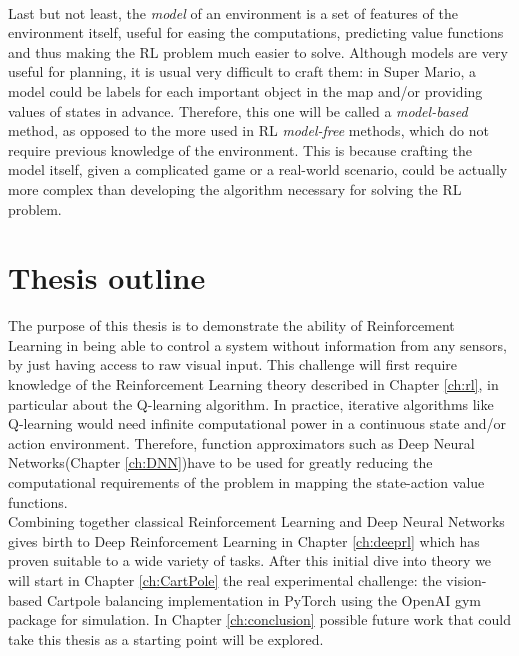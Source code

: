 \\
\indent Last but not least, the \textit{model} of an environment is a set of features of the environment itself, useful for easing the computations, predicting value functions and thus making the RL problem much easier to solve. Although models are very useful for planning, it is usual very difficult to craft them: in Super Mario, a model could be labels for each important object in the map and/or providing values of states in advance. Therefore, this one will be called a \textit{model-based} method, as opposed to the more used in RL \textit{model-free} methods, which do not require previous knowledge of the environment. This is because crafting the model itself, given a complicated game or a real-world scenario, could be actually more complex than developing the algorithm necessary for solving the RL problem.


\section{Thesis outline}

The purpose of this thesis is to demonstrate the ability of Reinforcement Learning in being able to control a system without information from any sensors, by just having access to raw visual input. This challenge will first require knowledge of the Reinforcement Learning theory described in Chapter \ref{ch:rl}, in particular about the Q-learning algorithm. In practice, iterative algorithms like Q-learning would need infinite computational power in a continuous state and/or action environment. Therefore, function approximators such as Deep Neural Networks(Chapter \ref{ch:DNN})have to be used for greatly reducing the computational requirements of the problem in mapping the state-action value functions. 
\\
\indent Combining together classical Reinforcement Learning and Deep Neural Networks gives birth to Deep Reinforcement Learning in Chapter \ref{ch:deeprl} which has proven suitable to a wide variety of tasks. After this initial dive into theory we will start in Chapter \ref{ch:CartPole} the real experimental challenge: the vision-based Cartpole balancing implementation in PyTorch using the OpenAI gym package for simulation. In Chapter \ref{ch:conclusion} possible future work that could take this thesis as a starting point will be explored.



